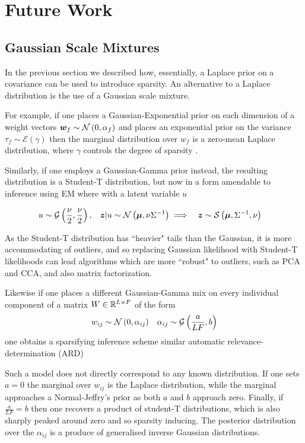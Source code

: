

\section{Future Work}
\subsection{Gaussian Scale Mixtures}
In the previous section we described how, essentially, a Laplace prior on a covariance can be used to introduce sparsity. An alternative to a Laplace distribution is the use of a Gaussian scale mixture.

For example, if one places a Gaussian-Exponential prior on each dimension of a weight vectors $\bm w_f \sim \mathcal{N} \left( {0}, {\alpha_f} \right)$ and places an exponential prior on the variance $\tau_f \sim \mathcal{E}\left(\gamma\right)$ then the marginal distribution over $w_f$ is a zero-mean Laplace distribution, where $\gamma$ controls the degree of sparsity \cite{Figueiredo2003}.

Similarly, if one employs a Gaussian-Gamma prior instead, the resulting distribution is a Student-T distribution, but now in a form amendable to inference using EM where with a latent variable $u$

\begin{align}
u & \sim \mathcal{G}\left(\frac{\nu}{2}, \frac{\nu}{2} \right) ,
& \bm z|u \sim \mathcal{N} \left( {\bm \mu}, {\nu {\Sigma}^{-1}} \right) 
& \implies & \bm z & \sim \mathcal{S}\left(\bm \mu, {\Sigma}^{-1}, \nu \right)
\end{align}

As the Student-T distribution has ``heavier" tails than the Gaussian, it is more accommodating of outliers, and so replacing Gaussian likelihood with Student-T likelihoods can lead algorithms which are more ``robust" to outliers, such as PCA and CCA\cite{Archambeau2006a}, and also matrix factorization\cite{Balaji2011}.

Likewise if one places a different Gaussian-Gamma mix on every individual component of a matrix $W \in { \mathbb{R}^{L \times F} }$ of the form
\begin{align}
w_{ij} &\sim \mathcal{N} \left( {0}, {\alpha_{ij}} \right) & \alpha_{ij} \sim \mathcal{G}\left(\frac{a}{LF}, b\right)
\end{align}
one obtains a sparsifying inference scheme\cite{Archambeau2009a} similar automatic relevance-determination (ARD)

Such a model does not directly correspond to any known distribution. If one sets $a=0$ the marginal over $w_{ij}$ is the Laplace distribution, while the marginal approaches a Normal-Jeffry's prior as both $a$ and $b$ approach zero. Finally, if $\frac{a}{LF} = b$ then one recovers a product of student-T distributions, which is also sharply peaked around zero and so sparsity inducing. The posterior distribution over the $\alpha_{ij}$ is a produce of generalised inverse Gaussian distributions.

